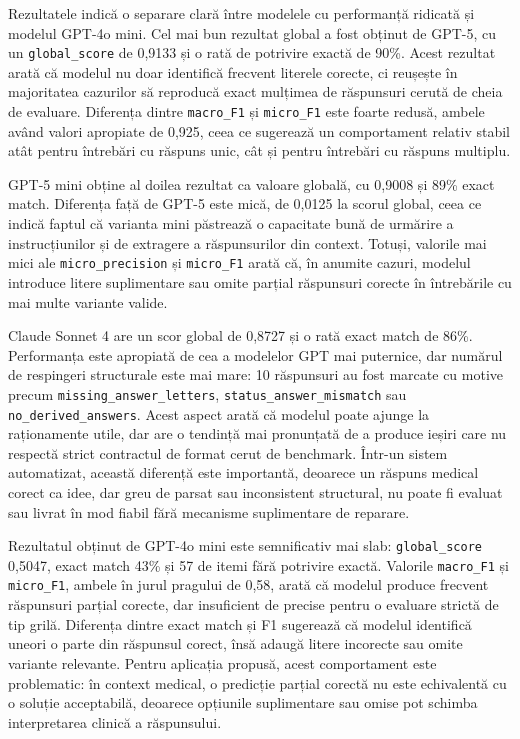 \documentclass[12pt, a4paper, oneside, romanian]{teza-upb}
\begin{document}
Rezultatele indică o separare clară între modelele cu performanță ridicată și modelul GPT-4o mini. Cel mai bun rezultat global a fost obținut de GPT-5, cu un \texttt{global\_score} de 0,9133 și o rată de potrivire exactă de 90\%. Acest rezultat arată că modelul nu doar identifică frecvent literele corecte, ci reușește în majoritatea cazurilor să reproducă exact mulțimea de răspunsuri cerută de cheia de evaluare. Diferența dintre \texttt{macro\_F1} și \texttt{micro\_F1} este foarte redusă, ambele având valori apropiate de 0,925, ceea ce sugerează un comportament relativ stabil atât pentru întrebări cu răspuns unic, cât și pentru întrebări cu răspuns multiplu.

GPT-5 mini obține al doilea rezultat ca valoare globală, cu 0,9008 și 89\% exact match. Diferența față de GPT-5 este mică, de 0,0125 la scorul global, ceea ce indică faptul că varianta mini păstrează o capacitate bună de urmărire a instrucțiunilor și de extragere a răspunsurilor din context. Totuși, valorile mai mici ale \texttt{micro\_precision} și \texttt{micro\_F1} arată că, în anumite cazuri, modelul introduce litere suplimentare sau omite parțial răspunsuri corecte în întrebările cu mai multe variante valide.

Claude Sonnet 4 are un scor global de 0,8727 și o rată exact match de 86\%. Performanța este apropiată de cea a modelelor GPT mai puternice, dar numărul de respingeri structurale este mai mare: 10 răspunsuri au fost marcate cu motive precum \texttt{missing\_answer\_letters}, \texttt{status\_answer\_mismatch} sau \texttt{no\_derived\_answers}. Acest aspect arată că modelul poate ajunge la raționamente utile, dar are o tendință mai pronunțată de a produce ieșiri care nu respectă strict contractul de format cerut de benchmark. Într-un sistem automatizat, această diferență este importantă, deoarece un răspuns medical corect ca idee, dar greu de parsat sau inconsistent structural, nu poate fi evaluat sau livrat în mod fiabil fără mecanisme suplimentare de reparare.

Rezultatul obținut de GPT-4o mini este semnificativ mai slab: \texttt{global\_score} 0,5047, exact match 43\% și 57 de itemi fără potrivire exactă. Valorile \texttt{macro\_F1} și \texttt{micro\_F1}, ambele în jurul pragului de 0,58, arată că modelul produce frecvent răspunsuri parțial corecte, dar insuficient de precise pentru o evaluare strictă de tip grilă. Diferența dintre exact match și F1 sugerează că modelul identifică uneori o parte din răspunsul corect, însă adaugă litere incorecte sau omite variante relevante. Pentru aplicația propusă, acest comportament este problematic: în context medical, o predicție parțial corectă nu este echivalentă cu o soluție acceptabilă, deoarece opțiunile suplimentare sau omise pot schimba interpretarea clinică a răspunsului.
\end{document}
